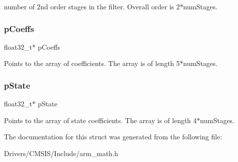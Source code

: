number of 2nd order stages in the filter. Overall order is 2$\ast$num\+Stages. \mbox{\label{structarm__biquad__casd__df1__inst__f32_aacbb8dd8eeba4b21fc2bb40076405ee3}} 
\subsubsection{\texorpdfstring{p\+Coeffs}{pCoeffs}}
{\footnotesize\ttfamily float32\+\_\+t$\ast$ p\+Coeffs}

Points to the array of coefficients. The array is of length 5$\ast$num\+Stages. \mbox{\label{structarm__biquad__casd__df1__inst__f32_a335c87e6fdc4b96601d95a5de8b9c463}} 
\subsubsection{\texorpdfstring{p\+State}{pState}}
{\footnotesize\ttfamily float32\+\_\+t$\ast$ p\+State}

Points to the array of state coefficients. The array is of length 4$\ast$num\+Stages. 

The documentation for this struct was generated from the following file\+:\begin{DoxyCompactItemize}
\item 
Drivers/\+C\+M\+S\+I\+S/\+Include/arm\+\_\+math.\+h\end{DoxyCompactItemize}
